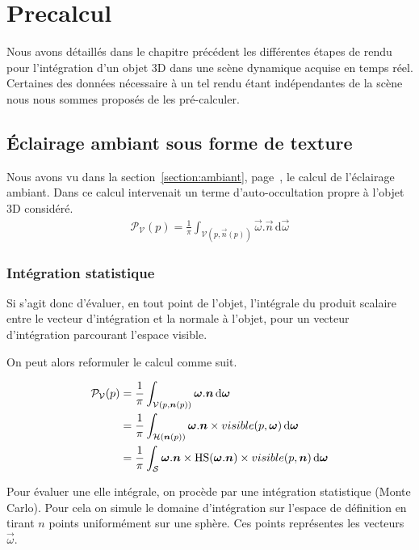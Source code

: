 \documentclass[10pt,a4paper,twoside, twocolumn]{report}
\newcommand{\Hs}{\operatorname{HS}}
\begin{document}
\chapter{Precalcul}

Nous avons détaillés dans le chapitre précédent les différentes étapes de rendu pour l'intégration d'un objet 3D dans une scène dynamique acquise en temps réel. Certaines des données nécessaire à un tel rendu étant indépendantes de la scène nous nous sommes proposés de les pré-calculer. 

\section{Éclairage ambiant sous forme de texture}\label{section:precomputation_ambiant}

Nous avons vu dans la section~\ref{section:ambiant}, page~\pageref{section:ambiant}, le calcul de l'éclairage ambiant. Dans ce calcul intervenait un terme d'auto-occultation propre à l'objet 3D considéré.
\begin{align}
	\mathcal P_{\mathcal V}(p) = \frac{1}{\pi}\int_{\mathcal V(p, \vec n(p))}\vec\omega.\vec n\, \mathrm d\vec\omega
\end{align}

\subsection{Intégration statistique}
Si s’agit donc d'évaluer, en tout point de l'objet, l’intégrale du produit scalaire entre le vecteur d’intégration et la normale à l'objet, pour un vecteur d’intégration parcourant l’espace visible.

On peut alors reformuler le calcul comme suit.

\begin{align}
\mathcal P_{\mathcal V}(p)	&= \frac{1}{\pi}\int_{\mathcal V(p, \vec n(p))}\vec\omega.\vec n\, \mathrm d\vec\omega \notag\\
														&= \frac{1}{\pi}\int_{\mathcal H(\vec n(p))}\vec\omega.\vec n\times visible(p, \vec \omega)\, \mathrm d\vec\omega \notag\\
														&= \frac{1}{\pi}\int_{\mathcal S}\vec\omega.\vec n\times \Hs(\vec \omega.\vec n)\times visible(p, \vec n)\, \mathrm d\vec\omega
\end{align}

Pour évaluer une elle intégrale, on procède par une intégration statistique (Monte Carlo). Pour cela on simule le domaine d'intégration sur l'espace de définition en tirant $n$ points uniformément sur une sphère. Ces points représentes les vecteurs $\vec\omega$.
\end{document}

